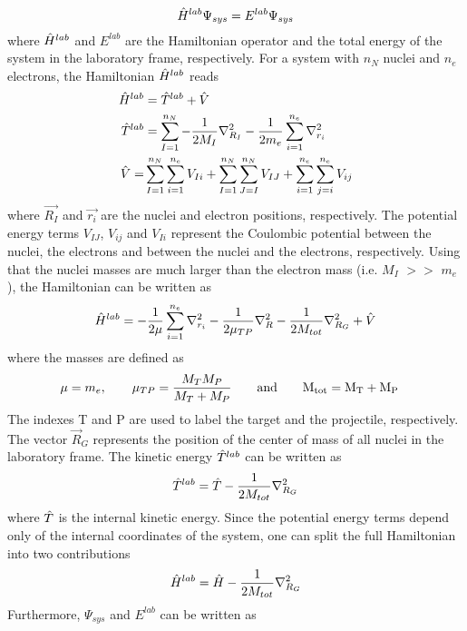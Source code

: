 \documentclass[a4paper, 10 pt]{report}
\begin{document}
\begin{equation}
\Hat{H}^{lab}\Psi_{sys} = E^{lab}\Psi_{sys}
\label{tiselab}
\end{equation}
where $\Hat{H}^{lab}$ and $E^{lab}$ are the Hamiltonian operator and the total energy of the system in the laboratory frame, respectively. 
For a system with $n_N$ nuclei and $n_e$ electrons, the Hamiltonian $\Hat{H}^{lab}$ reads
\begin{align}
\Hat{H}^{lab} & = \Hat{T}^{lab} + \Hat{V} \\
\Hat{T}^{lab} & = \sum_{I=1}^{n_N} -{1\over 2M_I} \nabla^2_{R_I} -{1\over 2 m_e} \sum_{i=1}^{n_e} \nabla^2_{r_i}  \\
\Hat{V}  = & \sum_{I=1}^{n_N} \sum_{i=1}^{n_e} V_{Ii} + \sum_{I=1}^{n_N} \sum_{J=I}^{n_N} V_{IJ} + \sum_{i=1}^{n_e} \sum_{j=i}^{n_e} V_{ij} 
\end{align}
where $\vec{R_I}$ and $\vec{r_i}$ are the nuclei and electron positions, respectively. The potential energy terms $V_{IJ}$, $V_{ij}$ and $V_{Ii}$ represent the Coulombic potential between the nuclei, the electrons and between the nuclei and the electrons, respectively. Using that the nuclei masses are much larger than the electron mass (i.e. $M_I$ $>>$ $m_e$), the Hamiltonian can be written as
\begin{equation}
\Hat{H}^{lab} = -{1\over 2\mu}\sum_{i=1}^{n_e} \nabla^2_{r_i}-{1\over 2\mu_{TP}}\nabla^2_{R}-{1\over 2M_{tot}}\nabla^2_{R_G} + \Hat{V}
\end{equation}
where the masses are defined as
\begin{align}
\mu & = m_e, \qquad  \mu_{TP}  = {M_T M_P\over M_T + M_P } \qquad \rm{and} \qquad M_{tot}  = M_T + M_P
\end{align}
The indexes T and P are used to label the target and the projectile, respectively.
The vector $\vec{R}_G$ represents the position of the center of mass of all nuclei in the laboratory frame. The kinetic energy $\Hat{T}^{lab}$ can be written as 
\begin{equation}
\Hat{T}^{lab} = \Hat{T} - {1\over 2M_{tot}} \nabla^2_{R_G} 
\end{equation}
where $ \Hat{T}$ is the internal kinetic energy. Since the potential energy terms depend only of the internal coordinates of the system, one can split the full Hamiltonian into two contributions
\begin{equation}
\Hat{H}^{lab} = \Hat{H} - {1\over 2M_{tot}} \nabla^2_{R_G}
\label{hsys}
\end{equation}
Furthermore, $\Psi_{sys}$ and $E^{lab}$ can be written as
\end{document}
